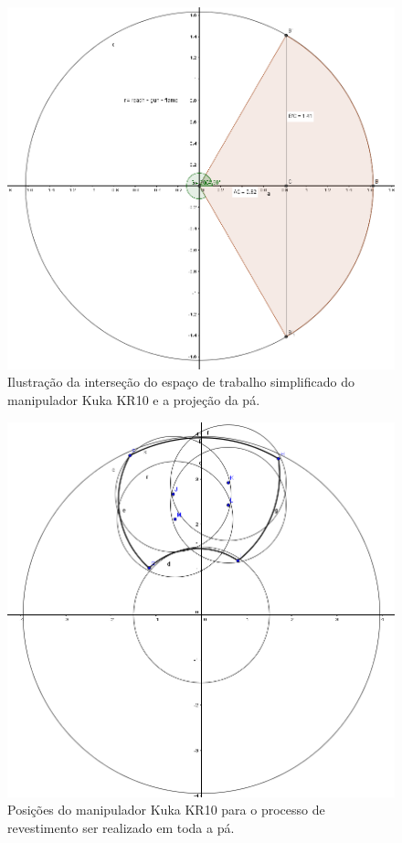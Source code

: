 \begin{figure}[h!]	
	\includegraphics[width=\columnwidth]{figs/bighatch/kukageom.jpg}
	\caption{Ilustração da interseção do espaço de trabalho simplificado do
	manipulador Kuka KR10 e a projeção da pá.}
	\label{fig::kukageom}
\end{figure}

\begin{figure}[h!]	
	\includegraphics[width=\columnwidth]{figs/bighatch/kukacircles.png}
	\caption{Posições do manipulador Kuka KR10 para o processo de
	revestimento ser realizado em toda a pá.}
	\label{fig::kukacircles}
\end{figure}

